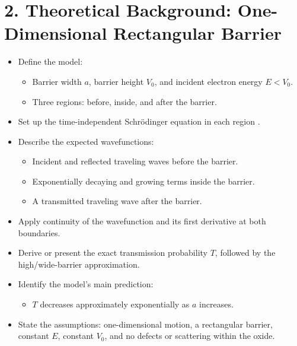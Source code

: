 \documentclass[12pt]{article}
\begin{document}
\section*{2. Theoretical Background: One-Dimensional Rectangular Barrier}
\begin{itemize}
    \item Define the model:
    \begin{itemize}
        \item Barrier width \(a\), barrier height \(V_0\), and incident electron energy \(E<V_0\).
        \item Three regions: before, inside, and after the barrier.
    \end{itemize}
    \item Set up the time-independent Schr\"odinger equation in each region \cite{townsend2010}.
    \item Describe the expected wavefunctions:
    \begin{itemize}
        \item Incident and reflected traveling waves before the barrier.
        \item Exponentially decaying and growing terms inside the barrier.
        \item A transmitted traveling wave after the barrier.
    \end{itemize}
    \item Apply continuity of the wavefunction and its first derivative at both boundaries.
    \item Derive or present the exact transmission probability \(T\), followed by the high/wide-barrier approximation.
    \item Identify the model's main prediction:
    \begin{itemize}
        \item \(T\) decreases approximately exponentially as \(a\) increases.
    \end{itemize}
    \item State the assumptions: one-dimensional motion, a rectangular barrier, constant \(E\), constant \(V_0\), and no defects or scattering within the oxide.
\end{itemize}
\end{document}
